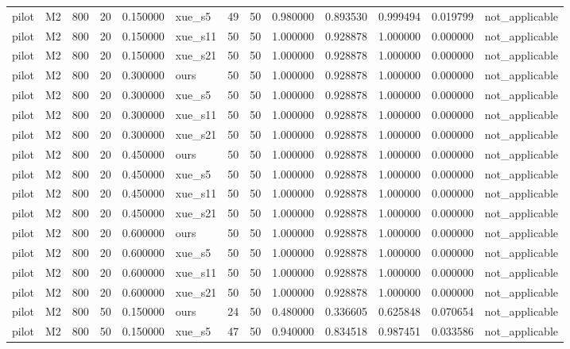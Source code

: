 \begin{longtable}{llrrrlrrrrrrl}
pilot & M2 & 800 & 20 & 0.150000 & xue\_s5 & 49 & 50 & 0.980000 & 0.893530 & 0.999494 & 0.019799 & not\_applicable \\
pilot & M2 & 800 & 20 & 0.150000 & xue\_s11 & 50 & 50 & 1.000000 & 0.928878 & 1.000000 & 0.000000 & not\_applicable \\
pilot & M2 & 800 & 20 & 0.150000 & xue\_s21 & 50 & 50 & 1.000000 & 0.928878 & 1.000000 & 0.000000 & not\_applicable \\
pilot & M2 & 800 & 20 & 0.300000 & ours & 50 & 50 & 1.000000 & 0.928878 & 1.000000 & 0.000000 & not\_applicable \\
pilot & M2 & 800 & 20 & 0.300000 & xue\_s5 & 50 & 50 & 1.000000 & 0.928878 & 1.000000 & 0.000000 & not\_applicable \\
pilot & M2 & 800 & 20 & 0.300000 & xue\_s11 & 50 & 50 & 1.000000 & 0.928878 & 1.000000 & 0.000000 & not\_applicable \\
pilot & M2 & 800 & 20 & 0.300000 & xue\_s21 & 50 & 50 & 1.000000 & 0.928878 & 1.000000 & 0.000000 & not\_applicable \\
pilot & M2 & 800 & 20 & 0.450000 & ours & 50 & 50 & 1.000000 & 0.928878 & 1.000000 & 0.000000 & not\_applicable \\
pilot & M2 & 800 & 20 & 0.450000 & xue\_s5 & 50 & 50 & 1.000000 & 0.928878 & 1.000000 & 0.000000 & not\_applicable \\
pilot & M2 & 800 & 20 & 0.450000 & xue\_s11 & 50 & 50 & 1.000000 & 0.928878 & 1.000000 & 0.000000 & not\_applicable \\
pilot & M2 & 800 & 20 & 0.450000 & xue\_s21 & 50 & 50 & 1.000000 & 0.928878 & 1.000000 & 0.000000 & not\_applicable \\
pilot & M2 & 800 & 20 & 0.600000 & ours & 50 & 50 & 1.000000 & 0.928878 & 1.000000 & 0.000000 & not\_applicable \\
pilot & M2 & 800 & 20 & 0.600000 & xue\_s5 & 50 & 50 & 1.000000 & 0.928878 & 1.000000 & 0.000000 & not\_applicable \\
pilot & M2 & 800 & 20 & 0.600000 & xue\_s11 & 50 & 50 & 1.000000 & 0.928878 & 1.000000 & 0.000000 & not\_applicable \\
pilot & M2 & 800 & 20 & 0.600000 & xue\_s21 & 50 & 50 & 1.000000 & 0.928878 & 1.000000 & 0.000000 & not\_applicable \\
pilot & M2 & 800 & 50 & 0.150000 & ours & 24 & 50 & 0.480000 & 0.336605 & 0.625848 & 0.070654 & not\_applicable \\
pilot & M2 & 800 & 50 & 0.150000 & xue\_s5 & 47 & 50 & 0.940000 & 0.834518 & 0.987451 & 0.033586 & not\_applicable \\

\end{longtable}
